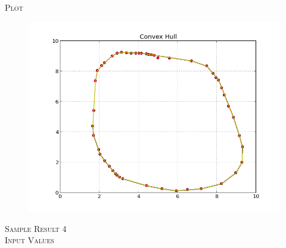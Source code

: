 \documentclass[pdftex,12pt,a4paper]{article}
\newcommand{\nspace}{\\[0.25cm]}
\begin{document}
\textsc{Plot} \hfill \nspace

\begin{figure}[h!]
  \centering
	\includegraphics[scale=0.75]{img/monotone_test_3.png}
\end{figure}



\newpage
\textsc{\large Sample Result 4} \hfill \nspace

\textsc{Input Values} \hfill \nspace
\end{document}
